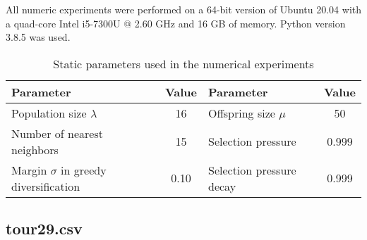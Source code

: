 \documentclass[a4paper,10pt]{article}
\newcommand{\ReplaceMe}[1]{{\color{blue}#1}}
\begin{document}
All numeric experiments were performed on a 64-bit version of Ubuntu 20.04 with a quad-core Intel i5-7300U @ 2.60 GHz and 16 GB of memory. Python version 3.8.5 was used.

\begin{table}[h]
\begin{center}
\caption{Static parameters used in the numerical experiments}
\label{table:experiments}
\begin{tabular}{|l|c||l|c|}\hline
\rowcolor[HTML]{C0C0C0}
Parameter	& Value		& Parameter	& Value \\ \hline
Population size $\lambda$	&16 	&Offspring size $\mu$	&50 \\
Number of nearest neighbors	& 15	& Selection pressure	& 0.999 \\
Margin $\sigma$ in greedy diversification	&0.10	&Selection pressure decay	&0.999 \\
\hline
\end{tabular}
\end{center}
\end{table}


\subsection{tour29.csv}




\end{document}
